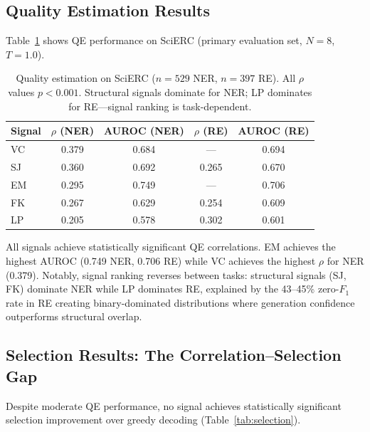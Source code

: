 \documentclass[11pt]{article}
\begin{document}
\subsection{Quality Estimation Results}

Table~\ref{tab:qe_main} shows QE performance on SciERC (primary evaluation set, $N = 8$, $T = 1.0$).

\begin{table}[t]
\centering
\small
\begin{tabular}{lcccc}
\toprule
Signal & $\rho$ (NER) & AUROC (NER) & $\rho$ (RE) & AUROC (RE) \\
\midrule
VC & 0.379 & 0.684 & --- & 0.694 \\
SJ & 0.360 & 0.692 & 0.265 & 0.670 \\
EM & 0.295 & 0.749 & --- & 0.706 \\
FK & 0.267 & 0.629 & 0.254 & 0.609 \\
LP & 0.205 & 0.578 & 0.302 & 0.601 \\
\bottomrule
\end{tabular}
\caption{Quality estimation on SciERC ($n=529$ NER, $n=397$ RE). All $\rho$ values $p < 0.001$. Structural signals dominate for NER; LP dominates for RE---signal ranking is task-dependent.}
\label{tab:qe_main}
\end{table}

All signals achieve statistically significant QE correlations. EM achieves the highest AUROC (0.749 NER, 0.706 RE) while VC achieves the highest $\rho$ for NER (0.379). Notably, signal ranking reverses between tasks: structural signals (SJ, FK) dominate NER while LP dominates RE, explained by the 43--45\% zero-$F_1$ rate in RE creating binary-dominated distributions where generation confidence outperforms structural overlap.

\subsection{Selection Results: The Correlation--Selection Gap}

Despite moderate QE performance, no signal achieves statistically significant selection improvement over greedy decoding (Table~\ref{tab:selection}).
\end{document}
